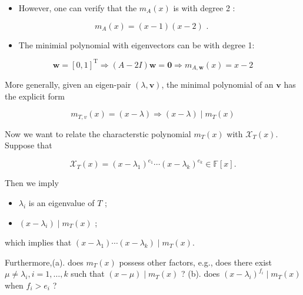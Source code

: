 \documentclass[11pt]{article}
\begin{document}
\begin{itemize}
\item However, one can verify that the \({m}_{A}\left( x\right)\) is with degree 2 :
\end{itemize}

\[
{m}_{A}\left( x\right)  = \left( {x - 1}\right) \left( {x - 2}\right) \text{ . }
\]

\begin{itemize}
\item The minimial polynomial with eigenvectors can be with degree 1:
\end{itemize}

\[
\mathbf{w} = {\left\lbrack  0,1\right\rbrack  }^{\mathrm{T}} \Rightarrow  \left( {A - {2I}}\right) \mathbf{w} = \mathbf{0} \Rightarrow  {m}_{A,\mathbf{w}}\left( x\right)  = x - 2
\]

More generally, given an eigen-pair \(\left( {\lambda ,\mathbf{v}}\right)\), the minimal polynomial of an \(\mathbf{v}\) has the explicit form

\[
{m}_{T,v}\left( x\right)  = \left( {x - \lambda }\right)  \Rightarrow  \left( {x - \lambda }\right)  \mid  {m}_{T}\left( x\right)
\]

Now we want to relate the characterstic polynomial \({m}_{T}\left( x\right)\) with \({\mathcal{X}}_{T}\left( x\right)\). Suppose that

\[
{\mathcal{X}}_{T}\left( x\right)  = {\left( x - {\lambda }_1\right) }^{{e}_1}\cdots {\left( x - {\lambda }_{k}\right) }^{{e}_{k}} \in  \mathbb{F}\left\lbrack  x\right\rbrack  . \tag{7.1}
\]

Then we imply

\begin{itemize}
\item \({\lambda }_{i}\) is an eigenvalue of \(T\) ;
\end{itemize}

\begin{itemize}
\item \(\left( {x - {\lambda }_{i}}\right)  \mid  {m}_{T}\left( x\right)\) ;
\end{itemize}

which implies that \(\left( {x - {\lambda }_1}\right) \cdots \left( {x - {\lambda }_{k}}\right)  \mid  {m}_{T}\left( x\right)\).

Furthermore,(a). does \({m}_{T}\left( x\right)\) possess other factors, e.g., does there exist \(\mu  \neq  {\lambda }_{i},i = 1,\ldots ,k\) such that \(\left( {x - \mu }\right)  \mid  {m}_{T}\left( x\right)\) ? (b). does \({\left( x - {\lambda }_{i}\right) }^{{f}_{i}} \mid  {m}_{T}\left( x\right)\) when \({f}_{i} > {e}_{i}\) ?
\end{document}
